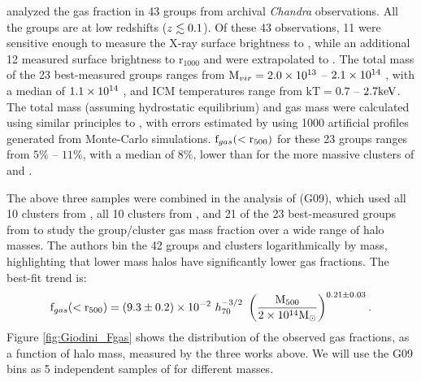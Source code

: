 \textbf{\citet{Sun2009}} analyzed the gas fraction in 43 groups from
archival \textit{Chandra} observations. All the groups are at low
redshifts ($z \lesssim 0.1$). Of these 43 observations, 11 were sensitive
enough to measure the X-ray surface brightness to \rfive{}, while an
additional 12 measured surface brightness to r$_{1000}$ and were
extrapolated to \rfive{}. The total mass of the 23 best-measured
groups ranges from $\textrm{M\ensuremath{_{vir}}} = 2.0\times 10^{13}$ -- $2.1 \times 10^{14}$ \Msun, with a
median of $1.1 \times 10^{14}$ \Msun, and ICM temperatures range from
$\textrm{kT} = 0.7$ -- $2.7 \textrm{keV}$. The total mass (assuming hydrostatic
equilibrium) and gas mass were calculated using similar principles to
\citet{Vikhlinin2006}, with errors estimated by using 1000 artificial
profiles generated from Monte-Carlo simulations. $\textrm{f\ensuremath{_{gas}}}(<\textrm{r\ensuremath{_{500}}})$ for
these 23 groups ranges from $5\%$ -- $11\%$, with a median of $8\%$,
lower than for the more massive clusters of \citet{Vikhlinin2006} and
\citet{Arnaud2007}.

The above three samples were combined in the analysis of
\textbf{\citet{Giodini2009}} (G09), which used all 10 clusters from
\citet{Vikhlinin2006}, all 10 clusters from \citet{Arnaud2007}, and 21
of the 23 best-measured groups from \citet{Sun2009} to study the
group/cluster gas mass fraction over a wide range of halo masses. The
authors bin the 42 groups and clusters logarithmically by mass,
highlighting that lower mass halos have significantly lower gas
fractions. The best-fit trend is:
\begin{equation}
\textrm{f\ensuremath{_{gas}}}(<\textrm{r\ensuremath{_{500}}}) = (9.3 \pm 0.2)\times 10^{-2}~h_{70}^{-3/2}~
\left(\frac{\textrm{M\ensuremath{_{500}}}}{2\times 10^{14}\textrm{M}_\odot}\right)^{0.21 \pm 0.03}.
\end{equation}
Figure \ref{fig:Giodini_Fgas} shows the distribution of the observed
gas fractions, as a function of halo mass, measured by the three works
above. We will use the G09 bins as 5 independent samples of \fg{} for
different masses. 


\afterpage{\clearpage}


